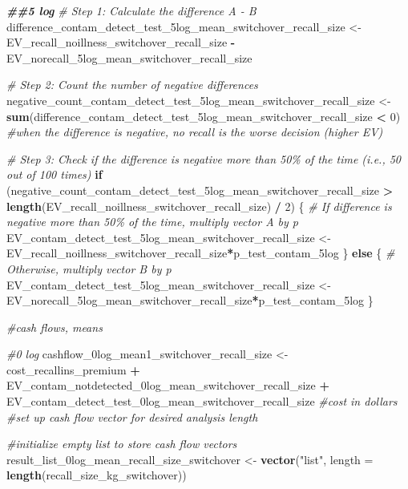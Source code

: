 \documentclass[
]{article}
\newenvironment{Shaded}{\begin{snugshade}}{\end{snugshade}}
\newcommand{\AttributeTok}[1]{\textcolor[rgb]{0.13,0.29,0.53}{#1}}
\newcommand{\CommentTok}[1]{\textcolor[rgb]{0.56,0.35,0.01}{\textit{#1}}}
\newcommand{\ControlFlowTok}[1]{\textcolor[rgb]{0.13,0.29,0.53}{\textbf{#1}}}
\newcommand{\DecValTok}[1]{\textcolor[rgb]{0.00,0.00,0.81}{#1}}
\newcommand{\DocumentationTok}[1]{\textcolor[rgb]{0.56,0.35,0.01}{\textbf{\textit{#1}}}}
\newcommand{\FunctionTok}[1]{\textcolor[rgb]{0.13,0.29,0.53}{\textbf{#1}}}
\newcommand{\NormalTok}[1]{#1}
\newcommand{\OtherTok}[1]{\textcolor[rgb]{0.56,0.35,0.01}{#1}}
\newcommand{\SpecialCharTok}[1]{\textcolor[rgb]{0.81,0.36,0.00}{\textbf{#1}}}
\newcommand{\StringTok}[1]{\textcolor[rgb]{0.31,0.60,0.02}{#1}}
\begin{document}
\begin{Shaded}
\begin{Highlighting}[]
\DocumentationTok{\#\#5 log}
\CommentTok{\# Step 1: Calculate the difference A {-} B}
\NormalTok{difference\_contam\_detect\_test\_5log\_mean\_switchover\_recall\_size }\OtherTok{\textless{}{-}}\NormalTok{ EV\_recall\_noillness\_switchover\_recall\_size }\SpecialCharTok{{-}}\NormalTok{ EV\_norecall\_5log\_mean\_switchover\_recall\_size}

\CommentTok{\# Step 2: Count the number of negative differences}
\NormalTok{negative\_count\_contam\_detect\_test\_5log\_mean\_switchover\_recall\_size }\OtherTok{\textless{}{-}} \FunctionTok{sum}\NormalTok{(difference\_contam\_detect\_test\_5log\_mean\_switchover\_recall\_size }\SpecialCharTok{\textless{}} \DecValTok{0}\NormalTok{) }\CommentTok{\#when the difference is negative, no recall is the worse decision (higher EV)}

\CommentTok{\# Step 3: Check if the difference is negative more than 50\% of the time (i.e., 50 out of 100 times)}
\ControlFlowTok{if}\NormalTok{ (negative\_count\_contam\_detect\_test\_5log\_mean\_switchover\_recall\_size }\SpecialCharTok{\textgreater{}} \FunctionTok{length}\NormalTok{(EV\_recall\_noillness\_switchover\_recall\_size) }\SpecialCharTok{/} \DecValTok{2}\NormalTok{) \{}
  \CommentTok{\# If difference is negative more than 50\% of the time, multiply vector A by p}
\NormalTok{  EV\_contam\_detect\_test\_5log\_mean\_switchover\_recall\_size }\OtherTok{\textless{}{-}}\NormalTok{ EV\_recall\_noillness\_switchover\_recall\_size}\SpecialCharTok{*}\NormalTok{p\_test\_contam\_5log}
\NormalTok{\} }\ControlFlowTok{else}\NormalTok{ \{}
  \CommentTok{\# Otherwise, multiply vector B by p}
\NormalTok{ EV\_contam\_detect\_test\_5log\_mean\_switchover\_recall\_size  }\OtherTok{\textless{}{-}}\NormalTok{ EV\_norecall\_5log\_mean\_switchover\_recall\_size}\SpecialCharTok{*}\NormalTok{p\_test\_contam\_5log}
\NormalTok{\}}


\CommentTok{\#cash flows, means}

\CommentTok{\#0 log}
\NormalTok{cashflow\_0log\_mean1\_switchover\_recall\_size }\OtherTok{\textless{}{-}}\NormalTok{ cost\_recallins\_premium }\SpecialCharTok{+}\NormalTok{ EV\_contam\_notdetected\_0log\_mean\_switchover\_recall\_size }\SpecialCharTok{+}\NormalTok{ EV\_contam\_detect\_test\_0log\_mean\_switchover\_recall\_size }\CommentTok{\#cost in dollars}
\CommentTok{\#set up cash flow vector for desired analysis length}

\CommentTok{\#initialize empty list to store cash flow vectors}
\NormalTok{result\_list\_0log\_mean\_recall\_size\_switchover }\OtherTok{\textless{}{-}} \FunctionTok{vector}\NormalTok{(}\StringTok{"list"}\NormalTok{, }\AttributeTok{length =} \FunctionTok{length}\NormalTok{(recall\_size\_kg\_switchover))}



\end{Highlighting}
\end{Shaded}
\end{document}
